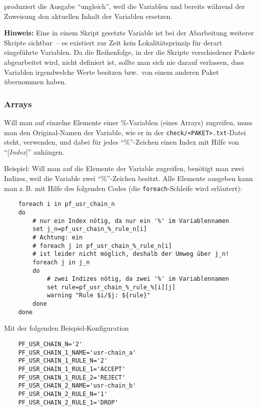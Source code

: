     produziert die Ausgabe "`ungleich"', weil die Variablen  und
     bereits während der Zuweisung den aktuellen Inhalt der Variablen
     ersetzen.

    \textbf{Hinweis:} Eine in einem Skript gesetzte Variable ist bei der
    Abarbeitung weiterer Skripte sichtbar~-- es existiert zur Zeit kein
    Lokalitätsprinzip für derart eingeführte Variablen. Da die Reihenfolge, in
    der die Skripte verschiedener Pakete abgearbeitet wird, nicht definiert ist,
    sollte man sich nie darauf verlassen, dass Variablen irgendwelche Werte
    besitzen bzw.\ von einem anderen Paket übernommen haben.

\subsubsection{Arrays}

    Will man auf einzelne Elemente einer \%-Variablen (eines Arrays)
    zugreifen, muss man den Original-Namen der Variable, wie er in der
    \texttt{check/<PAKET>.txt}-Datei steht, verwenden, und dabei für
    jedes "`\%"'-Zeichen einen Index mit Hilfe von "`[\emph{Index}]"' anhängen.

    Beispiel: Will man auf die Elemente der Variable
     zugreifen, benötigt man zwei Indizes,
    weil die Variable zwei "`\%"'-Zeichen besitzt. Alle Elemente ausgeben
    kann man z.\,B. mit Hilfe des folgenden Codes (die \texttt{foreach}-Schleife
    wird  erläutert):

\begin{example}
\begin{verbatim}
    foreach i in pf_usr_chain_n
    do
        # nur ein Index nötig, da nur ein '%' im Variablennamen
        set j_n=pf_usr_chain_%_rule_n[i]
        # Achtung: ein
        # foreach j in pf_usr_chain_%_rule_n[i]
        # ist leider nicht möglich, deshalb der Umweg über j_n!
        foreach j in j_n
        do
            # zwei Indizes nötig, da zwei '%' im Variablennamen
            set rule=pf_usr_chain_%_rule_%[i][j]
            warning "Rule $i/$j: ${rule}"
        done
    done
\end{verbatim}
\end{example}

    Mit der folgenden Beispiel-Konfiguration

\begin{example}
\begin{verbatim}
    PF_USR_CHAIN_N='2'
    PF_USR_CHAIN_1_NAME='usr-chain_a'
    PF_USR_CHAIN_1_RULE_N='2'
    PF_USR_CHAIN_1_RULE_1='ACCEPT'
    PF_USR_CHAIN_1_RULE_2='REJECT'
    PF_USR_CHAIN_2_NAME='usr-chain_b'
    PF_USR_CHAIN_2_RULE_N='1'
    PF_USR_CHAIN_2_RULE_1='DROP'
\end{verbatim}
\end{example}


